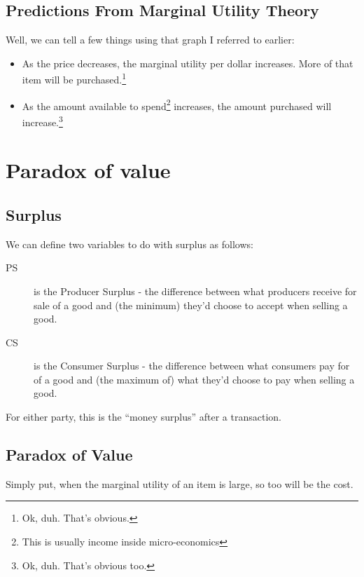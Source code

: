                 \subsection{Predictions From Marginal Utility Theory} %
                \label{sub:predictions_from_marginal_utility_theory}
                    Well, we can tell a few things using that graph I referred to earlier:

                    \begin{itemize}
                        \item As the price decreases, the marginal utility per dollar increases.
                            More of that item will be purchased.\footnote{Ok, duh. That's obvious.}
                        \item As the amount available to spend\footnote{This is usually income inside micro-economics} increases, the amount purchased will increase.\footnote{Ok, duh. That's obvious too.}
                    \end{itemize}
            \section{Paradox of value} %
            \label{sec:paradox_of_value}
                \subsection{Surplus} %
                \label{sub:surplus}
                    We can define two variables to do with surplus as follows:
                    \begin{description}
                        \item[PS] is the Producer Surplus - the difference between what producers receive for sale of a good and (the minimum) they'd choose to accept when selling a good.
                        \item[CS] is the Consumer Surplus - the difference between what consumers pay for of a good and (the maximum of) what they'd choose to pay when selling a good.
                    \end{description}
                    For either party, this is the ``money surplus'' after a transaction.
                \subsection{Paradox of Value} %
                \label{sub:paradox_of_value}
                    Simply put,
                    when the marginal utility of an item is large, so too will be the cost.

